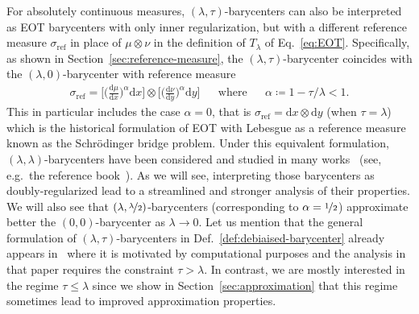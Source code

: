 \documentclass[11pt]{article}
\newcommand{\rev}[1]{{#1}}
\renewcommand{\d}{\mathrm{d}}
\begin{document}
For absolutely continuous measures, $(\lambda,\tau)$-barycenters can also be interpreted as EOT barycenters with only inner regularization, but with a different reference measure $\sigma_{\mathrm{ref}}$ in place of $\mu\otimes \nu$ in the definition of $T_\lambda$ of Eq.~\eqref{eq:EOT}. Specifically, as shown in Section~\ref{sec:reference-measure}, the $(\lambda,\tau)$-barycenter coincides with the $(\lambda,0)$-barycenter with reference measure
\begin{align}
\sigma_{\mathrm{ref}} = \Big[\Big(\frac{\d\mu}{\d x}\Big)^{\alpha}\d x\Big]\otimes \Big[\Big(\frac{\d\nu}{\d y}\Big)^{\alpha}\d y\Big]&&\text{where}&&\alpha \coloneqq 1-\tau/\lambda<1.
\end{align} 
This in particular includes the case $\alpha=0$, that is $\sigma_{\mathrm{ref}}=\d x \otimes \d y$ (when $\tau=\lambda$) which is the historical formulation of EOT with Lebesgue as a reference measure known as the Schr\"odinger bridge problem. Under this equivalent formulation, $(\lambda,\lambda)$-barycenters have been considered and studied in many works~\cite{cuturi2014fast,cuturi2018semidual,bigot2019penalization} (see, e.g.~the reference book~\cite[Chap.~9.2]{peyre2019computational}). As we will see, interpreting those barycenters as doubly-regularized lead to a streamlined and stronger analysis of their properties. We will also see that $(\lambda,\nicefrac\lambda2)$-barycenters (corresponding to $\alpha=\nicefrac12$) approximate better the $(0,0)$-barycenter as $\lambda\to 0$. Let us mention that the general formulation of $(\lambda,\tau)$-barycenters in Def.~\ref{def:debiaised-barycenter} already appears in~\cite{ballu2020stochastic} where it is motivated by computational purposes and the analysis in that paper requires the constraint $\tau>\lambda$. \rev{In contrast, we are mostly interested in the regime $\tau \leq \lambda$ since we show in Section~\ref{sec:approximation} that this regime sometimes lead to improved approximation properties.}
\end{document}
